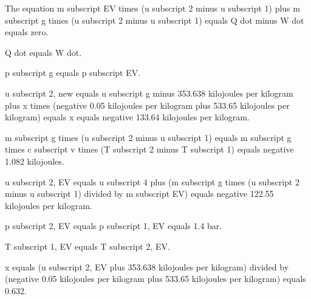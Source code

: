The equation m subscript EV times (u subscript 2 minus u subscript 1) plus m subscript g times (u subscript 2 minus u subscript 1) equals Q dot minus W dot equals zero.

Q dot equals W dot.

p subscript g equals p subscript EV.

u subscript 2, new equals u subscript g minus 353.638 kilojoules per kilogram plus x times (negative 0.05 kilojoules per kilogram plus 533.65 kilojoules per kilogram) equals x equals negative 133.64 kilojoules per kilogram.

m subscript g times (u subscript 2 minus u subscript 1) equals m subscript g times c subscript v times (T subscript 2 minus T subscript 1) equals negative 1.082 kilojoules.

u subscript 2, EV equals u subscript 4 plus (m subscript g times (u subscript 2 minus u subscript 1) divided by m subscript EV) equals negative 122.55 kilojoules per kilogram.

p subscript 2, EV equals p subscript 1, EV equals 1.4 bar.

T subscript 1, EV equals T subscript 2, EV.

x equals (u subscript 2, EV plus 353.638 kilojoules per kilogram) divided by (negative 0.05 kilojoules per kilogram plus 533.65 kilojoules per kilogram) equals 0.632.
